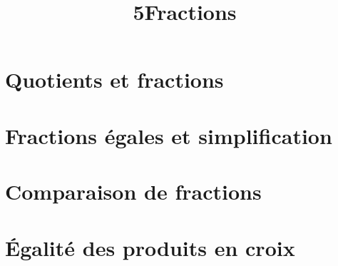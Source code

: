 \documentclass[12pt,a4paper]{article}
\date{}
\title{\textcircled{{\normalsize{5}}}Fractions}
\begin{document}
	\maketitle
	
	
	
	
	\vspace{-0.5cm}
	
	\section{Quotients et fractions}
	
	
	
	
	\section{Fractions égales et simplification}
	
	
	
	\newpage
	
	\section{Comparaison de fractions}
	
	
	
	\newpage
	\section{\'Egalité des produits en croix}
	
	
	
\end{document}
